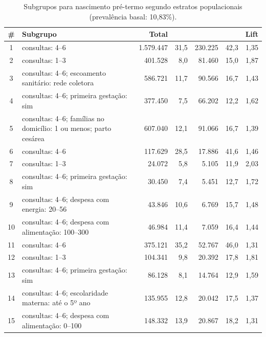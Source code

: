 \begin{table}[H]
\centering
\caption{Subgrupos para nascimento pré-termo segundo estratos populacionais (prevalência basal: 10,83\%).}
\label{tab:pt}

\scriptsize
\setlength{\tabcolsep}{4pt}
\renewcommand{\arraystretch}{1.08}

\begin{tabularx}{\textwidth}{@{}c Y r r r r r@{}}
\toprule
\textbf{\#} & \textbf{Subgrupo} & \textbf{Total} & \textbf{} & \textbf{} & \textbf{} & \textbf{Lift} \\
\midrule
{}
1 & consultas: 4--6 & 1.579.447 & 31,5 & 230.225 & 42,3 & 1,35 \\
2 & consultas: 1--3 & 401.528 & 8,0 & 81.460 & 15,0 & 1,87 \\
3 & consultas: 4--6; escoamento sanitário: rede coletora & 586.721 & 11,7 & 90.566 & 16,7 & 1,43 \\
4 & consultas: 4--6; primeira gestação: sim & 377.450 & 7,5 & 66.202 & 12,2 & 1,62 \\
5 & consultas: 4--6; famílias no domicílio: 1 ou menos; parto cesárea & 607.040 & 12,1 & 91.066 & 16,7 & 1,39 \\

6 & consultas: 4--6 & 117.629 & 28,5 & 17.886 & 41,6 & 1,46 \\
7 & consultas: 1--3 & 24.072 & 5,8 & 5.105 & 11,9 & 2,03 \\
8 & consultas: 4--6; primeira gestação: sim & 30.450 & 7,4 & 5.451 & 12,7 & 1,72 \\
9 & consultas: 4--6; despesa com energia: 20--56 & 43.846 & 10,6 & 6.769 & 15,7 & 1,48 \\
10 & consultas: 4--6; despesa com alimentação: 100--300 & 46.984 & 11,4 & 7.059 & 16,4 & 1,44 \\

11 & consultas: 4--6 & 375.121 & 35,2 & 52.767 & 46,0 & 1,31 \\
12 & consultas: 1--3 & 104.341 & 9,8 & 20.392 & 17,8 & 1,81 \\
13 & consultas: 4--6; primeira gestação: sim & 86.128 & 8,1 & 14.764 & 12,9 & 1,59 \\
14 & consultas: 4--6; escolaridade materna: até o 5º ano & 135.955 & 12,8 & 20.042 & 17,5 & 1,37 \\
15 & consultas: 4--6; despesa com alimentação: 0--100 & 148.332 & 13,9 & 20.867 & 18,2 & 1,31 \\


\end{tabularx}
\end{table}

